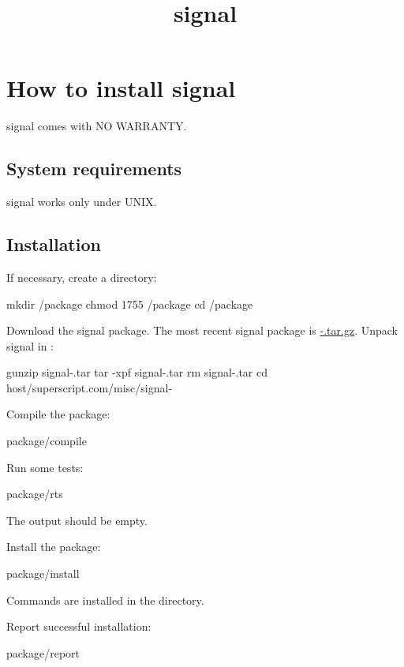 \documentclass{book}
\title{signal}
\begin{document}
\section{How to install signal}

signal comes with NO WARRANTY.

\subsection{System requirements}
signal works only under UNIX.

\subsection{Installation}
If necessary, create a  directory:
\begin{code}%
  mkdir /package
  chmod 1755 /package
  cd /package
\end{code}

Download the signal package.  The most recent signal package is
\href{\package~\version}{\package-\version.tar.gz}.  Unpack signal in
:
\begin{code}%
  gunzip signal-\version.tar
  tar -xpf signal-\version.tar
  rm signal-\version.tar
  cd host/superscript.com/misc/signal-\version
\end{code}

Compile the package:
\begin{code}%
  package/compile
\end{code}

Run some tests:
\begin{code}%
  package/rts
\end{code}
The output should be empty.

Install the package:
\begin{code}%
  package/install
\end{code}

Commands are installed in the
 directory.

Report successful installation:
\begin{code}%
  package/report
\end{code}
\end{document}

